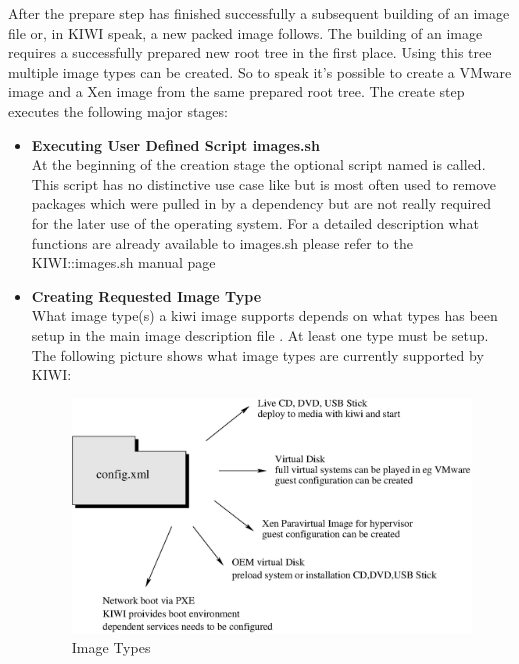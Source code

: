 After the prepare step has finished successfully a subsequent building of
an image file or, in KIWI speak, a new packed image follows.
The building of an image requires a successfully prepared new root
tree in the first place. Using this tree multiple image types can be
created. So to speak it's possible to create a VMware image and a
Xen image from the same prepared root tree. The create step executes the
following major stages:

\begin{itemize}
\item \textbf{Executing User Defined Script images.sh}\\
      At the beginning of the creation stage the optional script named
       is called. This script has no distinctive use case like
       but is most often used to remove packages which were pulled
      in by a dependency but are not really required for the later use
      of the operating system. For a detailed description what
      functions are already available to images.sh please refer to
      the KIWI::images.sh manual page
\item \textbf{Creating Requested Image Type}\\
      What image type(s) a kiwi image supports depends on what types has been
      setup in the main image description file . At least one type
      must be setup. The following picture shows what image types are
      currently supported by KIWI:

      \begin{figure}[h]
      \centering
      \includegraphics[scale=0.5]{pictures/types.eps}
      \caption{Image Types}
      \label{fig:types}
      \end{figure}
\end{itemize}


